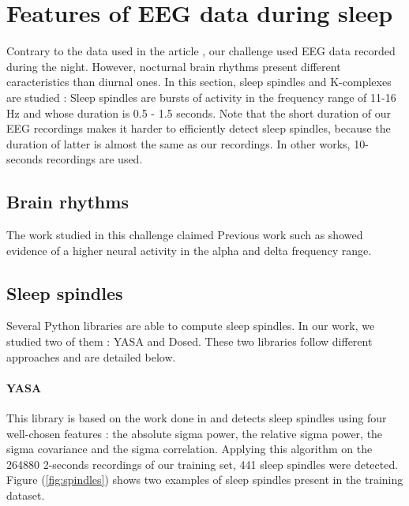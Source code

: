 \section{Features of EEG data during sleep}

Contrary to the data used in the article \cite{vanPutten2018}, our challenge used EEG data recorded during the night. However, nocturnal brain rhythms present different caracteristics than diurnal ones. In this section, sleep spindles and K-complexes are studied : 
Sleep spindles are bursts of activity in the frequency range of 11-16 Hz and whose duration is 0.5 - 1.5 seconds. 
Note that the short duration of our EEG recordings makes it harder to efficiently detect sleep spindles, because the duration of latter is almost the same as our recordings. In other works, 10-seconds recordings are used.

\subsection{Brain rhythms}

The work studied in this challenge claimed Previous work such as \cite{Latta2005} showed evidence of a higher neural activity in the alpha and delta frequency range.

\subsection{Sleep spindles}


Several Python libraries are able to compute sleep spindles. In our work, we studied two of them : YASA\cite{Vallat2020} and Dosed\cite{Chambon2018}. These two libraries follow different approaches and are detailed below. 

\paragraph{YASA} This library is based on the work done in \cite{Lacourse2019} and detects sleep spindles using four well-chosen features : 
the absolute sigma power, the relative sigma power, the sigma covariance and the sigma correlation.
Applying this algorithm on the 264880 2-seconds recordings of our training set, 441 sleep spindles were detected. Figure (\ref{fig:spindles}) shows two examples of sleep spindles present in the training dataset. 

